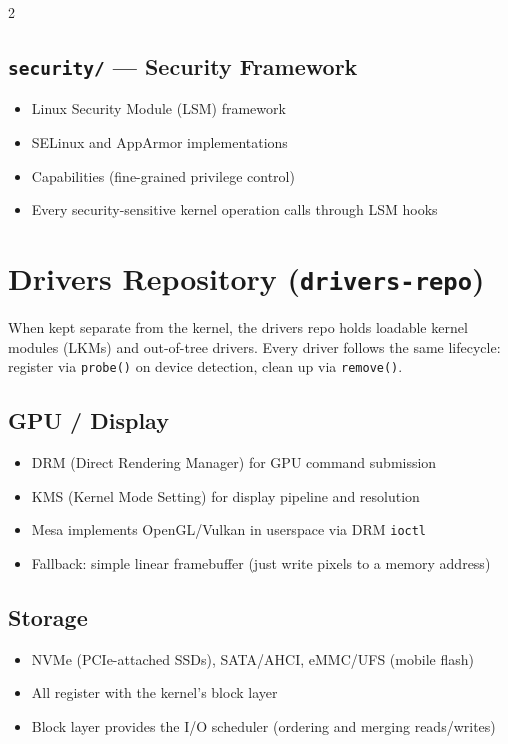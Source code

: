 2\documentclass[11pt,a4paper]{article}
\begin{document}
\subsection{\texttt{security/} --- Security Framework}
\begin{itemize}[noitemsep]
  \item Linux Security Module (LSM) framework
  \item SELinux and AppArmor implementations
  \item Capabilities (fine-grained privilege control)
  \item Every security-sensitive kernel operation calls through LSM hooks
\end{itemize}

\section{Drivers Repository (\texttt{drivers-repo})}

When kept separate from the kernel, the drivers repo holds loadable kernel modules (LKMs) and out-of-tree drivers. Every driver follows the same lifecycle: register via \texttt{probe()} on device detection, clean up via \texttt{remove()}.

\subsection{GPU / Display}
\begin{itemize}[noitemsep]
  \item DRM (Direct Rendering Manager) for GPU command submission
  \item KMS (Kernel Mode Setting) for display pipeline and resolution
  \item Mesa implements OpenGL/Vulkan in userspace via DRM \texttt{ioctl}
  \item Fallback: simple linear framebuffer (just write pixels to a memory address)
\end{itemize}

\subsection{Storage}
\begin{itemize}[noitemsep]
  \item NVMe (PCIe-attached SSDs), SATA/AHCI, eMMC/UFS (mobile flash)
  \item All register with the kernel's block layer
  \item Block layer provides the I/O scheduler (ordering and merging reads/writes)
\end{itemize}
\end{document}
